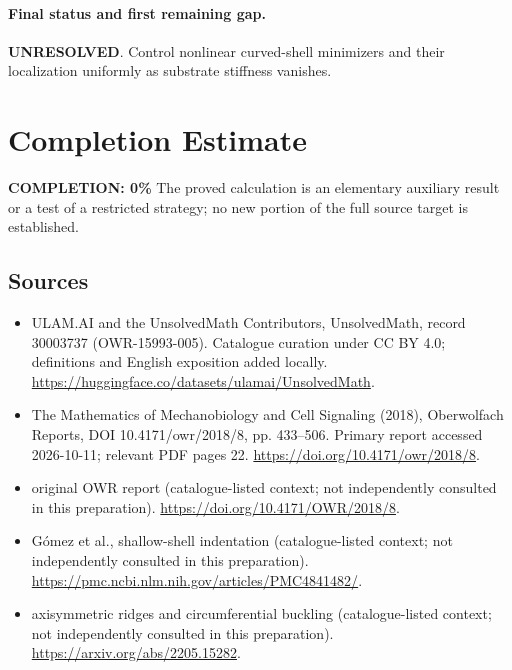 \documentclass[11pt]{article}
\begin{document}
\paragraph{Final status and first remaining gap.}
\textbf{UNRESOLVED}. Control nonlinear curved-shell minimizers and their localization uniformly as substrate stiffness vanishes.

\section{Completion Estimate}
\noindent\textbf{COMPLETION: 0\%}
The proved calculation is an elementary auxiliary result or a test of a restricted strategy; no new portion of the full source target is established.

\subsection{Sources}
\begin{itemize}
\item[\hypertarget{source:30003737:1}{S1}] ULAM.AI and the UnsolvedMath Contributors, UnsolvedMath, record 30003737 (OWR-15993-005). Catalogue curation under CC BY 4.0; definitions and English exposition added locally.
\url{https://huggingface.co/datasets/ulamai/UnsolvedMath}.
\item[\hypertarget{source:30003737:2}{S2}] The Mathematics of Mechanobiology and Cell Signaling (2018), Oberwolfach Reports, DOI 10.4171/owr/2018/8, pp. 433--506. Primary report accessed 2026-10-11; relevant PDF pages 22.
\url{https://doi.org/10.4171/owr/2018/8}.
\item[\hypertarget{source:30003737:3}{S3}] original OWR report (catalogue-listed context; not independently consulted in this preparation).
\url{https://doi.org/10.4171/OWR/2018/8}.
\item[\hypertarget{source:30003737:4}{S4}] Gómez et al., shallow-shell indentation (catalogue-listed context; not independently consulted in this preparation).
\url{https://pmc.ncbi.nlm.nih.gov/articles/PMC4841482/}.
\item[\hypertarget{source:30003737:5}{S5}] axisymmetric ridges and circumferential buckling (catalogue-listed context; not independently consulted in this preparation).
\url{https://arxiv.org/abs/2205.15282}.
\end{itemize}
\label{end:30003737}
\end{document}
